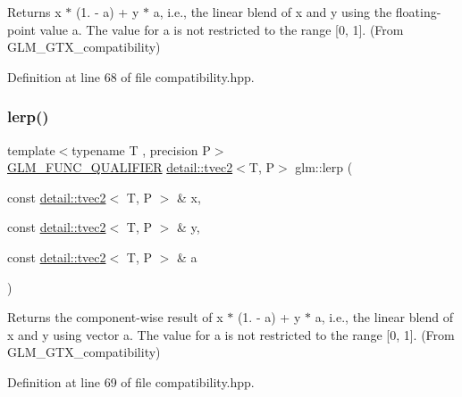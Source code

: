 Returns x $\ast$ (1. -\/ a) + y $\ast$ a, i.\+e., the linear blend of x and y using the floating-\/point value a. The value for a is not restricted to the range \mbox{[}0, 1\mbox{]}. (From G\+L\+M\+\_\+\+G\+T\+X\+\_\+compatibility) 



Definition at line 68 of file compatibility.\+hpp.

\mbox{\label{group__gtx__compatibility_ga9cc12766a2675ce054a30b0cab4b567b}} 
\subsubsection{\texorpdfstring{lerp()}{lerp()}\hspace{0.1cm}{\footnotesize\ttfamily [5/7]}}
{\footnotesize\ttfamily template$<$typename T , precision P$>$ \\
\hyperlink{setup_8hpp_a33fdea6f91c5f834105f7415e2a64407}{G\+L\+M\+\_\+\+F\+U\+N\+C\+\_\+\+Q\+U\+A\+L\+I\+F\+I\+ER} \hyperlink{structglm_1_1detail_1_1tvec2}{detail\+::tvec2}$<$T, P$>$ glm\+::lerp (\begin{DoxyParamCaption}\item[{const \hyperlink{structglm_1_1detail_1_1tvec2}{detail\+::tvec2}$<$ T, P $>$ \&}]{x,  }\item[{const \hyperlink{structglm_1_1detail_1_1tvec2}{detail\+::tvec2}$<$ T, P $>$ \&}]{y,  }\item[{const \hyperlink{structglm_1_1detail_1_1tvec2}{detail\+::tvec2}$<$ T, P $>$ \&}]{a }\end{DoxyParamCaption})}



Returns the component-\/wise result of x $\ast$ (1. -\/ a) + y $\ast$ a, i.\+e., the linear blend of x and y using vector a. The value for a is not restricted to the range \mbox{[}0, 1\mbox{]}. (From G\+L\+M\+\_\+\+G\+T\+X\+\_\+compatibility) 



Definition at line 69 of file compatibility.\+hpp.

\mbox{\label{group__gtx__compatibility_gaa07546447a0138988802c82cf38aa53d}} 
